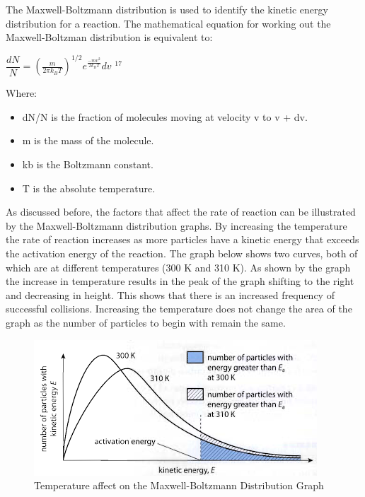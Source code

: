 The Maxwell-Boltzmann distribution is used to identify the kinetic energy distribution for a reaction. The mathematical equation for working out the Maxwell-Boltzman distribution is equivalent to:

$\dfrac{dN}{N}= \left(\frac{m}{2\pi k_BT} \right)^{1/2}e^{\frac{-mv^2}{2k_BT}}dv$ $^{17}$

Where:

\begin{itemize}
\item dN/N is the fraction of molecules moving at velocity v to v + dv.
\item m is the mass of the molecule.
\item kb is the Boltzmann constant.
\item T is the absolute temperature.
\end{itemize}

As discussed before, the factors that affect the rate of reaction can be illustrated by the Maxwell-Boltzmann distribution graphs. By increasing the temperature the rate of reaction increases as more particles have a kinetic energy that exceeds the activation energy of the reaction. The graph below shows two curves, both of which are at different temperatures (300 K and 310 K). As shown by the graph the increase in temperature results in the peak of the graph shifting to the right and decreasing in height. This shows that there is an increased frequency of  successful collisions. Increasing the temperature does not change the area of the graph as the number of particles to begin with remain the same.

\begin{figure}[H]
    \includegraphics[width=\textwidth]{./Planning/Images/TemperatureMaxwell.png}
    \caption{Temperature affect on the Maxwell-Boltzmann Distribution Graph} \label{fig:TemperatureMaxwell}
\end{figure}

